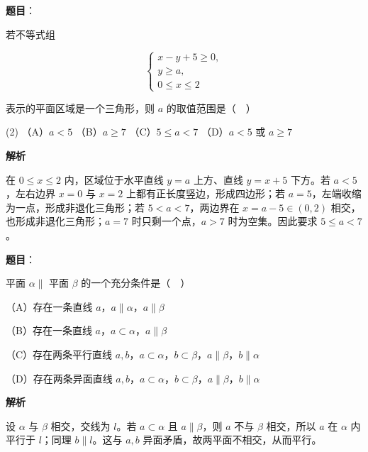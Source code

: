 \begin{answer}

\textbf{题目}：

若不等式组

\nopagebreak[4]
\[
\begin{cases}
x-y+5\geq 0,\\
y\geq a,\\
0\leq x\leq 2
\end{cases}
\]

表示的平面区域是一个三角形，则 $a$ 的取值范围是（　）

\begin{gkopts}(2)
\task （A）$a<5$
\task （B）$a\geq 7$
\task （C）$5\leq a<7$
\task （D）$a<5$ 或 $a\geq 7$
\end{gkopts}

\textbf{解析}

在 $0\leq x\leq2$ 内，区域位于水平直线 $y=a$ 上方、直线 $y=x+5$ 下方。若 $a<5$，左右边界 $x=0$ 与 $x=2$ 上都有正长度竖边，形成四边形；若 $a=5$，左端收缩为一点，形成非退化三角形；若 $5<a<7$，两边界在 $x=a-5\in(0,2)$ 相交，也形成非退化三角形；$a=7$ 时只剩一个点，$a>7$ 时为空集。因此要求 $5\leq a<7$。


\end{answer}
\begin{answer}

\textbf{题目}：

平面 $\alpha\parallel$ 平面 $\beta$ 的一个充分条件是（　）

（A）存在一条直线 $a$，$a\parallel\alpha$，$a\parallel\beta$

（B）存在一条直线 $a$，$a\subset\alpha$，$a\parallel\beta$

（C）存在两条平行直线 $a,b$，$a\subset\alpha$，$b\subset\beta$，$a\parallel\beta$，$b\parallel\alpha$

（D）存在两条异面直线 $a,b$，$a\subset\alpha$，$b\subset\beta$，$a\parallel\beta$，$b\parallel\alpha$

\textbf{解析}

设 $\alpha$ 与 $\beta$ 相交，交线为 $l$。若 $a\subset\alpha$ 且 $a\parallel\beta$，则 $a$ 不与 $\beta$ 相交，所以 $a$ 在 $\alpha$ 内平行于 $l$；同理 $b\parallel l$。这与 $a,b$ 异面矛盾，故两平面不相交，从而平行。


\end{answer}
